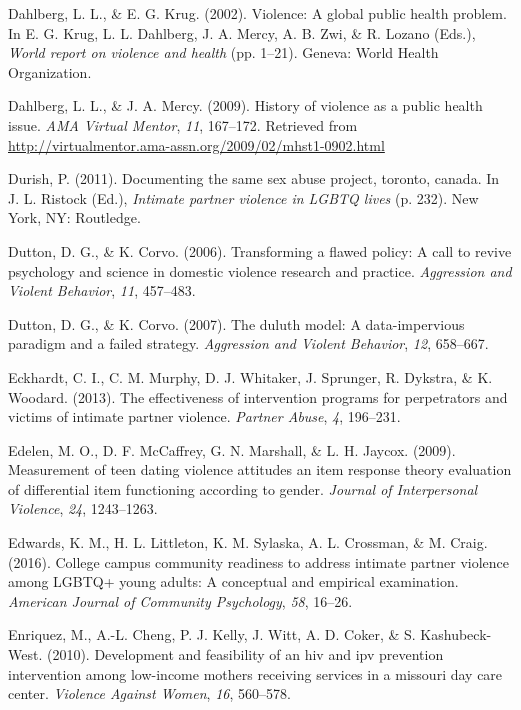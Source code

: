 \documentclass[11pt,]{tufte-book}
\begin{document}
\hypertarget{ref-dahlberg2002violence}{}
Dahlberg, L. L., \& E. G. Krug. (2002). Violence: A global public health
problem. In E. G. Krug, L. L. Dahlberg, J. A. Mercy, A. B. Zwi, \& R.
Lozano (Eds.), \emph{World report on violence and health} (pp. 1--21).
Geneva: World Health Organization.

\hypertarget{ref-dahlberg2009history}{}
Dahlberg, L. L., \& J. A. Mercy. (2009). History of violence as a public
health issue. \emph{AMA Virtual Mentor}, \emph{11}, 167--172. Retrieved
from \url{http://virtualmentor.ama-assn.org/2009/02/mhst1-0902.html}

\hypertarget{ref-durish2011documenting}{}
Durish, P. (2011). Documenting the same sex abuse project, toronto,
canada. In J. L. Ristock (Ed.), \emph{Intimate partner violence in LGBTQ
lives} (p. 232). New York, NY: Routledge.

\hypertarget{ref-dutton2006transforming}{}
Dutton, D. G., \& K. Corvo. (2006). Transforming a flawed policy: A call
to revive psychology and science in domestic violence research and
practice. \emph{Aggression and Violent Behavior}, \emph{11}, 457--483.

\hypertarget{ref-dutton2007duluth}{}
Dutton, D. G., \& K. Corvo. (2007). The duluth model: A data-impervious
paradigm and a failed strategy. \emph{Aggression and Violent Behavior},
\emph{12}, 658--667.

\hypertarget{ref-eckhardt2013effectiveness}{}
Eckhardt, C. I., C. M. Murphy, D. J. Whitaker, J. Sprunger, R. Dykstra,
\& K. Woodard. (2013). The effectiveness of intervention programs for
perpetrators and victims of intimate partner violence. \emph{Partner
Abuse}, \emph{4}, 196--231.

\hypertarget{ref-edelen2009measurement}{}
Edelen, M. O., D. F. McCaffrey, G. N. Marshall, \& L. H. Jaycox. (2009).
Measurement of teen dating violence attitudes an item response theory
evaluation of differential item functioning according to gender.
\emph{Journal of Interpersonal Violence}, \emph{24}, 1243--1263.

\hypertarget{ref-edwards2016college}{}
Edwards, K. M., H. L. Littleton, K. M. Sylaska, A. L. Crossman, \& M.
Craig. (2016). College campus community readiness to address intimate
partner violence among LGBTQ+ young adults: A conceptual and empirical
examination. \emph{American Journal of Community Psychology}, \emph{58},
16--26.

\hypertarget{ref-enriquez2010development}{}
Enriquez, M., A.-L. Cheng, P. J. Kelly, J. Witt, A. D. Coker, \& S.
Kashubeck-West. (2010). Development and feasibility of an hiv and ipv
prevention intervention among low-income mothers receiving services in a
missouri day care center. \emph{Violence Against Women}, \emph{16},
560--578.
\end{document}
